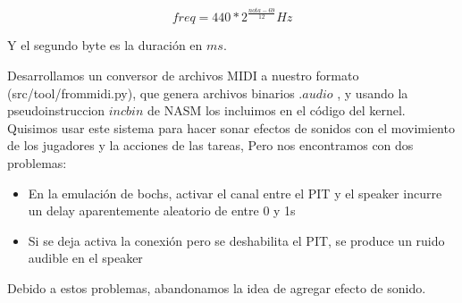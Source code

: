 $$ freq = 440 * 2^{\frac{nota - 69}{12}} Hz $$

Y el segundo byte es la duración en $ms$.

Desarrollamos un conversor de archivos MIDI a nuestro formato (src/tool/frommidi.py),
que genera archivos binarios $.audio$ , y usando la pseudoinstruccion $incbin$ de NASM
los incluimos en el código del kernel.
\\

Quisimos usar este sistema para hacer sonar efectos de sonidos con el movimiento de los jugadores y la acciones de las tareas, Pero nos encontramos con dos problemas:

\begin{itemize}
    \item En la emulación de bochs, activar el canal entre el PIT y el speaker incurre un delay aparentemente aleatorio de entre 0 y 1s
    \item Si se deja activa la conexión pero se deshabilita el PIT, se produce un ruido audible en el speaker
\end{itemize}

Debido a estos problemas, abandonamos la idea de agregar efecto de sonido.

